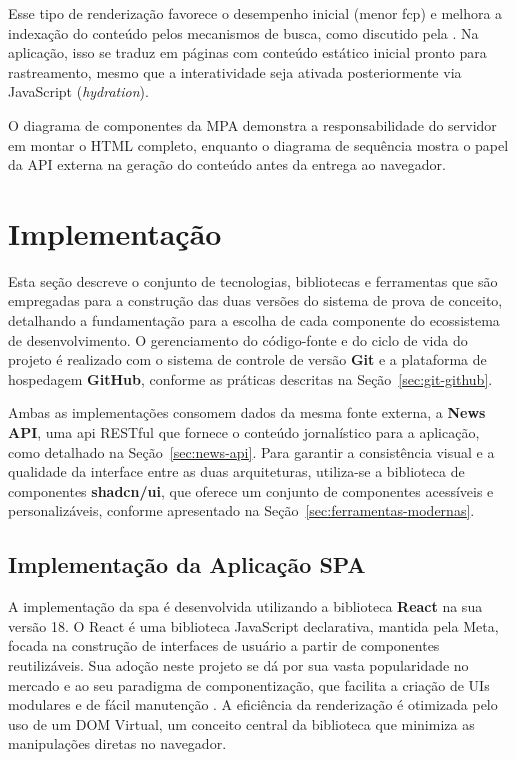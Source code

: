Esse tipo de renderização favorece o desempenho inicial (menor \acrshort{fcp}) e melhora a indexação do conteúdo pelos mecanismos de busca, como discutido pela \cite{atori2024}. Na aplicação, isso se traduz em páginas com conteúdo estático inicial pronto para rastreamento, mesmo que a interatividade seja ativada posteriormente via JavaScript (\textit{hydration}).

O diagrama de componentes da MPA demonstra a responsabilidade do servidor em montar o HTML completo, enquanto o diagrama de sequência mostra o papel da API externa na geração do conteúdo antes da entrega ao navegador.



\section{Implementação}
\label{sec:implementacao}

Esta seção descreve o conjunto de tecnologias, bibliotecas e ferramentas que são empregadas para a construção das duas versões do sistema de prova de conceito, detalhando a fundamentação para a escolha de cada componente do ecossistema de desenvolvimento. O gerenciamento do código-fonte e do ciclo de vida do projeto é realizado com o sistema de controle de versão \textbf{Git} e a plataforma de hospedagem \textbf{GitHub}, conforme as práticas descritas na Seção~\ref{sec:git-github}.

Ambas as implementações consomem dados da mesma fonte externa, a \textbf{News API}, uma \acrshort{api} RESTful que fornece o conteúdo jornalístico para a aplicação, como detalhado na Seção~\ref{sec:news-api}. Para garantir a consistência visual e a qualidade da interface entre as duas arquiteturas, utiliza-se a biblioteca de componentes \textbf{shadcn/ui}, que oferece um conjunto de componentes acessíveis e personalizáveis, conforme apresentado na Seção~\ref{sec:ferramentas-modernas}.

\subsection{Implementação da Aplicação SPA}
\label{ssec:implementacao_spa}

A implementação da \acrfull{spa} é desenvolvida utilizando a biblioteca \textbf{React} na sua versão 18. O React é uma biblioteca JavaScript declarativa, mantida pela Meta, focada na construção de interfaces de usuário a partir de componentes reutilizáveis. Sua adoção neste projeto se dá por sua vasta popularidade no mercado e ao seu paradigma de componentização, que facilita a criação de UIs modulares e de fácil manutenção \cite{react2025}. A eficiência da renderização é otimizada pelo uso de um DOM Virtual, um conceito central da biblioteca que minimiza as manipulações diretas no navegador.

